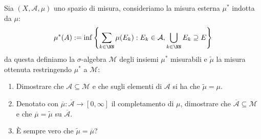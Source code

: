 \documentclass[11pt]{scrartcl}
\begin{document}
	\begin{exercise}
		Sia $(X,\mathcal{A},\mu)$ uno spazio di misura, consideriamo la misura esterna $\mu^*$ indotta da $\mu$:
		$$\mu^*(A):=\inf\left\{\sum_{k\in\NN}\mu(E_k):E_k\in \mathcal{A},\bigcup_{k\in\NN}E_k \supseteq E\right\}$$
		da questa definiamo la $\sigma$-algebra $\mathcal{M}$ degli insiemi $\mu^*$ misurabili e $\tilde{\mu}$ la misura ottenuta restringendo $\mu^*$ a $\mathcal{M}$:
		\begin{enumerate}
			\item Dimostrare che $\mathcal{A}\subseteq \mathcal{M}$ e che sugli elementi di $\mathcal{A}$ si ha che $\tilde{\mu}=\mu$.
			\item Denotato con $\overline{\mu}:\overline{\mathcal{A}}\to [0,\infty]$ il completamento di $\mu$, dimostrare che $\overline{\mathcal{A}}\subseteq \mathcal{M}$ e che $\overline{\mu}=\tilde{\mu}$ su $\overline{\mathcal{A}}$.
			\item \`E sempre vero che $\tilde{\mu}=\overline{\mu}$?
		\end{enumerate}
	\end{exercise}
\end{document}
